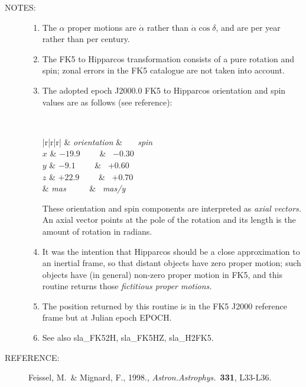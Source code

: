 \documentclass[11pt,twoside,nolof]{starlink}
\newcommand{\notes}[1]
 {
   \begin{description}
     \item[NOTES:]
         #1
   \end{description}
}
\providecommand{\aref}[1]
{
   \begin{description}
     \item[REFERENCE:]
         #1
   \end{description}
}
\begin{document}
\notes
{
 \begin{enumerate}
  \item The $\alpha$ proper motions are $\dot{\alpha}$ rather than
        $\dot{\alpha}\cos\delta$, and are per year rather than per century.
  \item The FK5 to Hipparcos
        transformation consists of a pure rotation and spin;
        zonal errors in the FK5 catalogue are not taken into account.
  \item The adopted epoch J2000.0 FK5 to Hipparcos orientation and spin
        values are as follows (see reference):

        \vspace{2ex}

        ~~~~~~~~~~~~
        \begin{tabular}{|r|r|r|} \hline
        &
        \multicolumn{1}{|c}\textit{orientation} &
        \multicolumn{1}{|c|}\textit{~~~spin~~~} \\ \hline
        $x$ & $-19.9$~~~~ & ~$-0.30$~~ \\
        $y$ &  $-9.1$~~~~ & ~$+0.60$~~ \\
        $z$ & $+22.9$~~~~ & ~$+0.70$~~ \\ \hline
        & \textit{mas}~~~~~ & ~\textit{mas/y}~ \\ \hline
        \end{tabular}

        \vspace{3ex}

        These orientation and spin components are interpreted as
        \textit{axial vectors.}  An axial vector points at the pole of
        the rotation and its length is the amount of rotation in radians.
  \item It was the intention that Hipparcos should be a close
        approximation to an inertial frame, so that distant objects
        have zero proper motion;  such objects have (in general)
        non-zero proper motion in FK5, and this routine returns those
        \textit{fictitious proper motions.}
  \item The position returned by this routine is in the FK5 J2000
        reference frame but at Julian epoch EPOCH.
  \item See also sla\_FK52H, sla\_FK5HZ, sla\_H2FK5.
 \end{enumerate}
}
\aref {Feissel, M.\ \& Mignard, F., 1998.,  \textit{Astron.Astrophys.}\
       \textbf{331}, L33-L36.}
\end{document}
